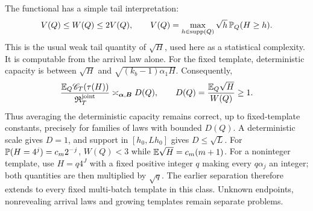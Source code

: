 The functional has a simple tail interpretation:
\begin{equation}\label{eq:random-W-tail-main}
 V(Q)\le W(Q)\le2V(Q),\qquad
 V(Q)=\max_{h\in\operatorname{supp}(Q)}\sqrt h\,\mathbb P_Q(H\ge h).
\end{equation}
This is the usual weak tail quantity of $\sqrt H$, used here as a
statistical complexity. It is computable from the arrival law alone.
For the fixed template, deterministic capacity is between $\sqrt H$
and $\sqrt{(k_b-1)\alpha_1H}$. Consequently,
\begin{equation}\label{eq:random-D-main}
 \frac{\mathbb E_Q\mathscr C_T(\tau(H))}{\mathfrak R_T^{\mathrm{joint}}}
 \asymp_{\boldsymbol\alpha,\boldsymbol B}
 D(Q),\qquad D(Q)=\frac{\mathbb E_Q\sqrt H}{W(Q)}\ge1.
\end{equation}
Thus averaging the deterministic capacity remains correct, up to
fixed-template constants, precisely for families of laws with bounded
$D(Q)$. A deterministic scale gives $D=1$, and support in
$[h_0,Lh_0]$ gives $D\le\sqrt L$. For
$\mathbb P(H=4^j)=c_m2^{-j}$, $W(Q)<3$ while
$\mathbb E\sqrt H=c_m(m+1)$. For a noninteger template, use $H=q4^J$
with a fixed positive integer $q$ making every $q\alpha_j$ an integer;
both quantities are then multiplied by $\sqrt q$.
The earlier separation therefore extends to
every fixed multi-batch template in this class. Unknown endpoints,
nonrevealing arrival laws and growing templates remain separate
problems.
